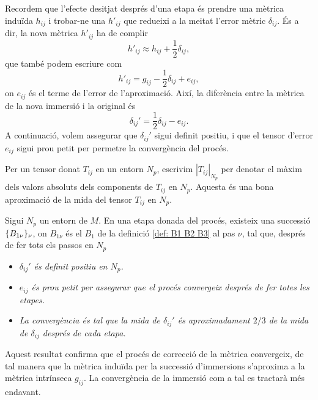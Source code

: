 Recordem que l'efecte desitjat després d'una etapa és prendre una mètrica induïda $h_{ij}$ i trobar-ne una $h'_{ij}$ que redueixi a la meitat l'error mètric $\delta_{ij}$. És a dir, la nova mètrica $h'_{ij}$ ha de complir
\begin{equation*}
    h'_{ij} \approx h_{ij} + \frac12\delta_{ij},
\end{equation*}
que també podem escriure com 
\begin{equation*}
    h'_{ij} = g_{ij} - \frac12\delta_{ij} + e_{ij},
\end{equation*}
on $e_{ij}$ és el terme de l'error de l'aproximació. Així, la diferència entre la mètrica de la nova immersió i la original és
\begin{equation}\label{eq:delta_prima}
    \delta_{ij}' = \frac12\delta_{ij} - e_{ij}.
\end{equation}
A continuació, volem assegurar que $\delta_{ij}'$ sigui definit positiu, i que el tensor d'error $e_{ij}$ sigui prou petit per permetre la convergència del procés.
\begin{nota}
    Per un tensor donat $T_{ij}$ en un entorn $N_p$, escrivim $|T_{ij}|_{N_p}$ per denotar el màxim dels valors absoluts dels components de $T_{ij}$ en $N_p$. Aquesta és una bona aproximació de la mida del tensor $T_{ij}$ en $N_p$.
\end{nota}
\begin{prop}\label{prop:dos de tres}
    Sigui $N_p$ un entorn de $M$. En una etapa donada del procés, existeix una successió $\{B_{1\nu}\}_{\nu}$, on $B_{1\nu}$ és el $B_1$ de la definició \ref{def: B1 B2 B3} al pas $\nu$, tal que, després de fer tots els passos en $N_p$
\end{prop}
\begin{itemize}
    \item \textit{$\delta_{ij}'$ és definit positiu en $N_p$.}
    \item \textit{$e_{ij}$ és prou petit per assegurar que el procés convergeix després de fer totes les etapes.}
    \item \textit{La convergència és tal que la mida de $\delta_{ij}'$ és aproximadament $2/3$ de la mida de $\delta_{ij}$ després de cada etapa. }
\end{itemize}
\begin{obs}
    Aquest resultat confirma que el procés de correcció de la mètrica convergeix, de tal manera que la mètrica induïda per la successió d'immersions s'aproxima a la mètrica intrínseca $g_{ij}$.
    La convergència de la immersió com a tal es tractarà més endavant. 
\end{obs}
